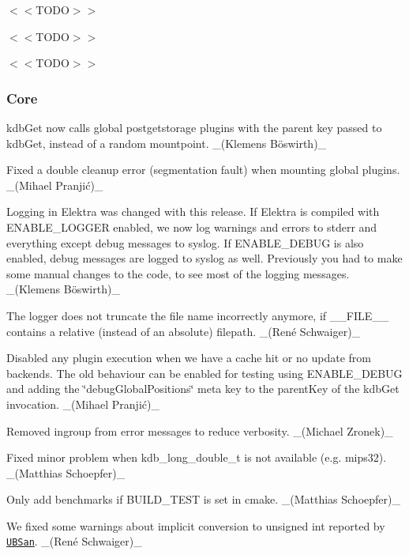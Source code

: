 \begin{DoxyItemize}
\item $<$$<$\+T\+O\+D\+O$>$$>$
\item $<$$<$\+T\+O\+D\+O$>$$>$
\item $<$$<$\+T\+O\+D\+O$>$$>$
\end{DoxyItemize}

\subsubsection*{Core}


\begin{DoxyItemize}
\item {\ttfamily kdb\+Get} now calls global postgetstorage plugins with the parent key passed to {\ttfamily kdb\+Get}, instead of a random mountpoint. \+\_\+(Klemens Böswirth)\+\_\+
\item Fixed a double cleanup error (segmentation fault) when mounting global plugins. \+\_\+(Mihael Pranjić)\+\_\+
\item Logging in Elektra was changed with this release. If Elektra is compiled with {\ttfamily E\+N\+A\+B\+L\+E\+\_\+\+L\+O\+G\+G\+ER} enabled, we now log warnings and errors to stderr and everything except debug messages to syslog. If {\ttfamily E\+N\+A\+B\+L\+E\+\_\+\+D\+E\+B\+UG} is also enabled, debug messages are logged to syslog as well. Previously you had to make some manual changes to the code, to see most of the logging messages. \+\_\+(Klemens Böswirth)\+\_\+
\item The logger does not truncate the file name incorrectly anymore, if {\ttfamily \+\_\+\+\_\+\+F\+I\+L\+E\+\_\+\+\_\+} contains a relative (instead of an absolute) filepath. \+\_\+(René Schwaiger)\+\_\+
\item Disabled any plugin execution when we have a cache hit or no update from backends. The old behaviour can be enabled for testing using {\ttfamily E\+N\+A\+B\+L\+E\+\_\+\+D\+E\+B\+UG} and adding the {\ttfamily \char`\"{}debug\+Global\+Positions\char`\"{}} meta key to the parent\+Key of the kdb\+Get invocation. \+\_\+(Mihael Pranjić)\+\_\+
\item Removed {\ttfamily ingroup} from error messages to reduce verbosity. \+\_\+(\+Michael Zronek)\+\_\+
\item Fixed minor problem when {\ttfamily kdb\+\_\+long\+\_\+double\+\_\+t} is not available (e.\+g. mips32). \+\_\+(\+Matthias Schoepfer)\+\_\+
\item Only add benchmarks if {\ttfamily B\+U\+I\+L\+D\+\_\+\+T\+E\+ST} is set in cmake. \+\_\+(\+Matthias Schoepfer)\+\_\+
\item We fixed some warnings about implicit conversion to {\ttfamily unsigned int} reported by \href{https://clang.llvm.org/docs/UndefinedBehaviorSanitizer.html}{\tt U\+B\+San}. \+\_\+(René Schwaiger)\+\_\+
\end{DoxyItemize}

